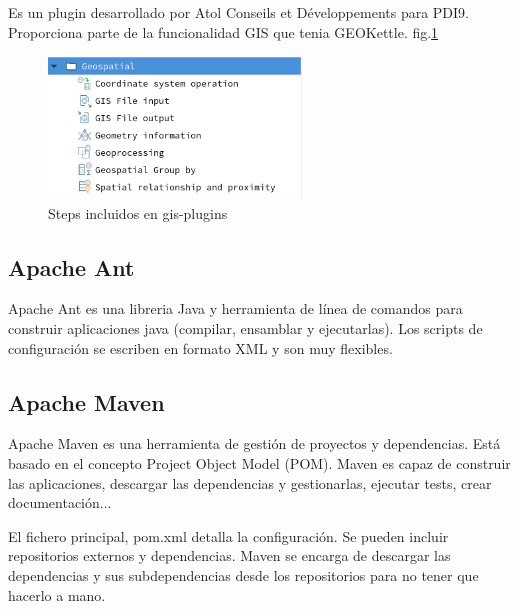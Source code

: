 Es un plugin desarrollado por Atol Conseils et Développements\cite{atol} para PDI9. Proporciona parte de la funcionalidad
GIS que tenia GEOKettle. fig.\ref{fig:gis-plugins} 

\begin{figure}[H]
    \includegraphics[width=0.6\textwidth]{images/gis-plugins.png}
    \centering
    \caption{Steps incluidos en gis-plugins}
    \label{fig:gis-plugins}
\end{figure}


\subsection{Apache Ant}

Apache Ant\cite{apache-ant} es una libreria Java y herramienta de línea de comandos para construir aplicaciones java (compilar,
ensamblar y ejecutarlas). Los scripts de configuración se escriben en formato XML y son muy flexibles.

\subsection{Apache Maven}

Apache Maven \cite{apache-maven} es una herramienta de gestión de proyectos y dependencias. Está basado en el
concepto Project Object Model (POM). Maven es capaz de construir las aplicaciones, descargar las dependencias y
gestionarlas, ejecutar tests, crear documentación...

El fichero principal, pom.xml detalla la configuración. Se pueden incluir repositorios externos y dependencias.
Maven se encarga de descargar las dependencias y sus subdependencias desde los repositorios para no tener que
hacerlo a mano.

